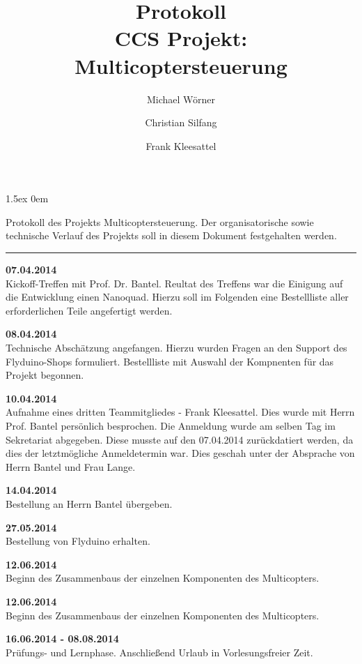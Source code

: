 \documentclass[a4paper,12pt]{article}
\begin{document}
\title{
\textbf{Protokoll}\\
CCS Projekt: Multicoptersteuerung}
\author{Michael Wörner \and Christian Silfang \and Frank Kleesattel}
\date{}

\parskip1.5ex
\parindent0em

\maketitle

Protokoll des Projekts \glqq Multicoptersteuerung\grqq. Der organisatorische sowie technische Verlauf des Projekts soll in diesem Dokument festgehalten werden.

\noindent\rule[1ex]{\textwidth}{1pt}
\vspace{1cm}

\textbf{07.04.2014}\\
Kickoff-Treffen mit Prof. Dr. Bantel. Reultat des Treffens war die Einigung auf die Entwicklung einen Nanoquad. Hierzu soll im Folgenden eine Bestellliste aller erforderlichen Teile angefertigt werden.

\textbf{08.04.2014}\\
Technische Abschätzung angefangen. Hierzu wurden Fragen an den Support des Flyduino-Shops formuliert.
Bestellliste mit Auswahl der Kompnenten für das Projekt begonnen.

\textbf{10.04.2014}\\
Aufnahme eines dritten Teammitgliedes - Frank Kleesattel. Dies wurde mit Herrn Prof. Bantel
persönlich besprochen. Die Anmeldung wurde am selben Tag im Sekretariat abgegeben. Diese musste 
auf den 07.04.2014 zurückdatiert werden, da dies der letztmögliche Anmeldetermin war. Dies geschah
unter der Absprache von Herrn Bantel und Frau Lange.

\textbf{14.04.2014}\\
Bestellung an Herrn Bantel übergeben.

\textbf{27.05.2014}\\
Bestellung von Flyduino erhalten.

\textbf{12.06.2014}\\
Beginn des Zusammenbaus der einzelnen Komponenten des Multicopters.

\textbf{12.06.2014}\\
Beginn des Zusammenbaus der einzelnen Komponenten des Multicopters.
\newpage

\textbf{16.06.2014 - 08.08.2014}\\
Prüfungs- und Lernphase. Anschließend Urlaub in Vorlesungsfreier Zeit.
\end{document}
